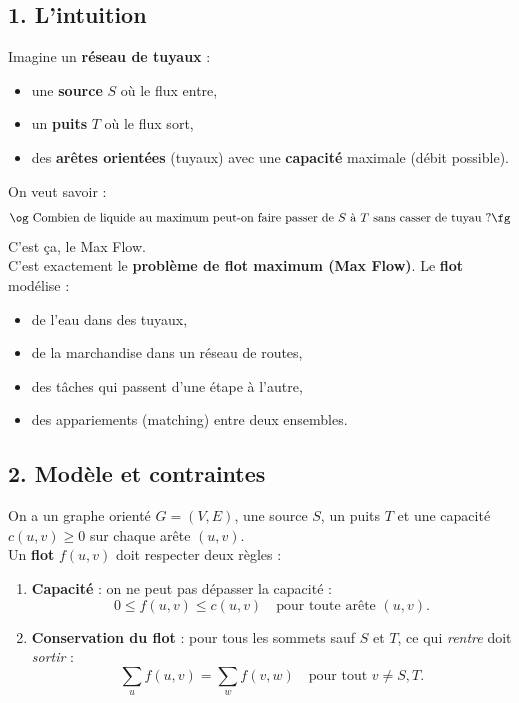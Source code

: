 
\subsection*{1. L’intuition}

Imagine un \textbf{réseau de tuyaux} :
\begin{itemize}
    \item une \textbf{source} $S$ où le flux entre,
    \item un \textbf{puits} $T$ où le flux sort,
    \item des \textbf{arêtes orientées} (tuyaux) avec une \textbf{capacité} maximale (débit possible).
\end{itemize}

On veut savoir :  
\[
\text{\og Combien de liquide au maximum peut-on faire passer de $S$ à $T$ sans casser de tuyau ?\fg}
\]
C’est ça, le Max Flow. \\

C’est exactement le \textbf{problème de flot maximum (Max Flow)}.  
Le \textbf{flot} modélise :
\begin{itemize}
    \item de l’eau dans des tuyaux,
    \item de la marchandise dans un réseau de routes,
    \item des tâches qui passent d’une étape à l’autre,
    \item des appariements (matching) entre deux ensembles.
\end{itemize}

\subsection*{2. Modèle et contraintes}

On a un graphe orienté $G = (V,E)$, une source $S$, un puits $T$ et une capacité $c(u,v) \ge 0$ sur chaque arête $(u,v)$. \\

Un \textbf{flot} $f(u,v)$ doit respecter deux règles :

\begin{enumerate}
    \item \textbf{Capacité} : on ne peut pas dépasser la capacité :
    \[
        0 \le f(u,v) \le c(u,v) \quad \text{pour toute arête } (u,v).
    \]
    \item \textbf{Conservation du flot} : pour tous les sommets sauf $S$ et $T$, ce qui \emph{rentre} doit \emph{sortir} :
    \[
        \sum_{u} f(u,v) = \sum_{w} f(v,w) \quad \text{pour tout } v \neq S,T.
    \]
\end{enumerate}

